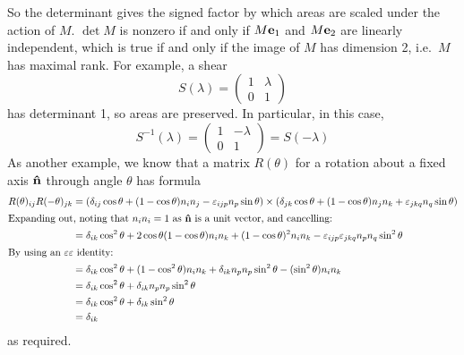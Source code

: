 So the determinant gives the signed factor by which areas are scaled under the action of \(M\). \(\det M\) is nonzero if and only if \(M\vb e_1\) and \(M\vb e_2\) are linearly independent, which is true if and only if the image of \(M\) has dimension 2, i.e.\ \(M\) has maximal rank. For example, a shear
\[ S(\lambda) = \begin{pmatrix}
		1 & \lambda \\ 0 & 1
	\end{pmatrix} \]
has determinant 1, so areas are preserved. In particular, in this case,
\[ S^{-1}(\lambda) = \begin{pmatrix}
		1 & -\lambda \\ 0 & 1
	\end{pmatrix} = S(-\lambda) \]
As another example, we know that a matrix \(R(\theta)\) for a rotation about a fixed axis \(\vu{n}\) through angle \(\theta\) has formula
\begin{align*}
	R(\theta)_{ij} R(-\theta)_{jk} & = (\delta_{ij}\cos \theta + (1 - \cos \theta) n_i n_j - \varepsilon_{ijp}n_p \sin \theta) \times (\delta_{jk}\cos \theta + (1 - \cos \theta) n_j n_k + \varepsilon_{jkq}n_q \sin \theta) \\
	\intertext{Expanding out, noting that \(n_in_i = 1\) as \(\vu{n}\) is a unit vector, and cancelling:}
	                               & = \delta_{ik} \cos^2 \theta + 2\cos \theta(1 - \cos \theta) n_in_k + (1 - \cos \theta)^2n_in_k - \varepsilon_{ijp}\varepsilon_{jkq} n_p n_q \sin^2 \theta                                \\
	\intertext{By using an \(\varepsilon\varepsilon\) identity:}
	                               & = \delta_{ik}\cos^2\theta + (1 - \cos^2 \theta)n_in_k + \delta_{ik}n_pn_p \sin^2 \theta - (\sin^2 \theta)n_in_k                                                                          \\
	                               & = \delta_{ik}\cos^2\theta + \delta_{ik}n_pn_p \sin^2 \theta                                                                                                                              \\
	                               & = \delta_{ik}\cos^2\theta + \delta_{ik} \sin^2 \theta                                                                                                                                    \\
	                               & = \delta_{ik}
\end{align*}
as required.
